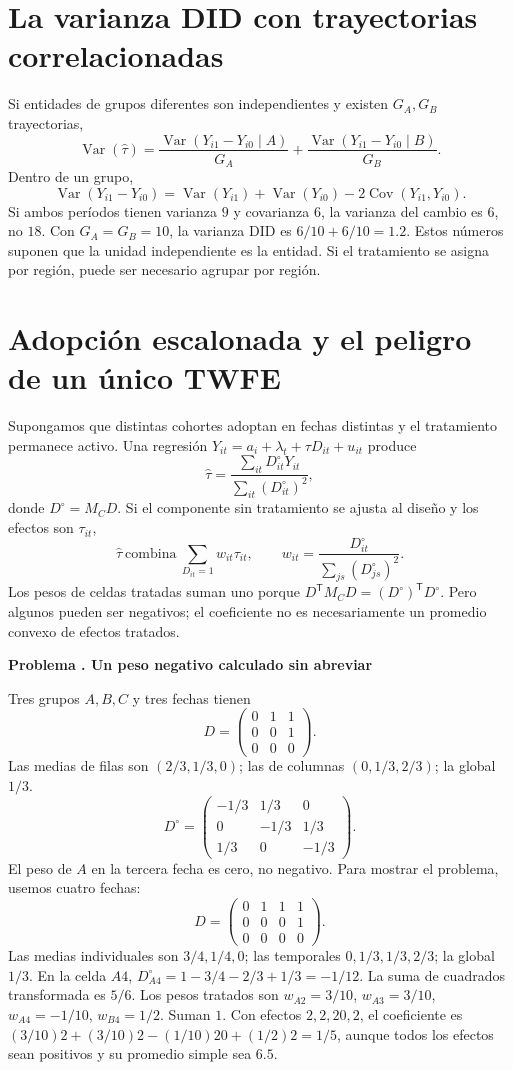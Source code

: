 \documentclass[11pt,a4paper]{article}
\newcommand{\T}{^{\mathsf T}}
\DeclareMathOperator{\Var}{Var}
\DeclareMathOperator{\Cov}{Cov}
\theoremstyle{definition}
\newcounter{problema}
\newenvironment{resuelto}[1]{\refstepcounter{problema}\par\medskip\Needspace{6\baselineskip}\textbf{Problema \theproblema. #1}\par}{\par\medskip}
\begin{document}
\section{La varianza DID con trayectorias correlacionadas}
Si entidades de grupos diferentes son independientes y existen $G_A,G_B$ trayectorias,
\[
\Var(\widehat\tau)
=\frac{\Var(Y_{i1}-Y_{i0}\mid A)}{G_A}
+\frac{\Var(Y_{i1}-Y_{i0}\mid B)}{G_B}.
\]
Dentro de un grupo,
\[
\Var(Y_{i1}-Y_{i0})
=\Var(Y_{i1})+\Var(Y_{i0})-2\Cov(Y_{i1},Y_{i0}).
\]
Si ambos períodos tienen varianza $9$ y covarianza $6$, la varianza del cambio es $6$, no $18$.
Con $G_A=G_B=10$, la varianza DID es $6/10+6/10=1.2$.
Estos números suponen que la unidad independiente es la entidad. Si el tratamiento se asigna por región, puede ser necesario agrupar por región.

\section{Adopción escalonada y el peligro de un único TWFE}
Supongamos que distintas cohortes adoptan en fechas distintas y el tratamiento permanece activo. Una regresión
$Y_{it}=a_i+\lambda_t+\tau D_{it}+u_{it}$ produce
\[
\widehat\tau=\frac{\sum_{it}D_{it}^{\circ}Y_{it}}
{\sum_{it}(D_{it}^{\circ})^2},
\]
donde $D^\circ=M_CD$.
Si el componente sin tratamiento se ajusta al diseño y los efectos son $\tau_{it}$,
\[
\widehat\tau\ \text{combina}\ 
\sum_{D_{it}=1}w_{it}\tau_{it},\qquad
w_{it}=\frac{D_{it}^{\circ}}{\sum_{js}(D_{js}^{\circ})^2}.
\]
Los pesos de celdas tratadas suman uno porque
$D\T M_CD=(D^\circ)\T D^\circ$.
Pero algunos pueden ser negativos; el coeficiente no es necesariamente un promedio convexo de efectos tratados.

\begin{resuelto}{Un peso negativo calculado sin abreviar}
Tres grupos $A,B,C$ y tres fechas tienen
\[
D=\begin{pmatrix}0&1&1\\0&0&1\\0&0&0\end{pmatrix}.
\]
Las medias de filas son $(2/3,1/3,0)$; las de columnas $(0,1/3,2/3)$; la global $1/3$.
\[
D^\circ=\begin{pmatrix}
-1/3&1/3&0\\
0&-1/3&1/3\\
1/3&0&-1/3
\end{pmatrix}.
\]
El peso de $A$ en la tercera fecha es cero, no negativo.
Para mostrar el problema, usemos cuatro fechas:
\[
D=\begin{pmatrix}0&1&1&1\\0&0&0&1\\0&0&0&0\end{pmatrix}.
\]
Las medias individuales son $3/4,1/4,0$; las temporales $0,1/3,1/3,2/3$; la global $1/3$.
En la celda $A4$, $D^\circ_{A4}=1-3/4-2/3+1/3=-1/12$.
La suma de cuadrados transformada es $5/6$.
Los pesos tratados son
$w_{A2}=3/10$, $w_{A3}=3/10$, $w_{A4}=-1/10$, $w_{B4}=1/2$.
Suman $1$.
Con efectos $2,2,20,2$, el coeficiente es
$(3/10)2+(3/10)2-(1/10)20+(1/2)2=1/5$,
aunque todos los efectos sean positivos y su promedio simple sea $6.5$.
\end{resuelto}
\end{document}
